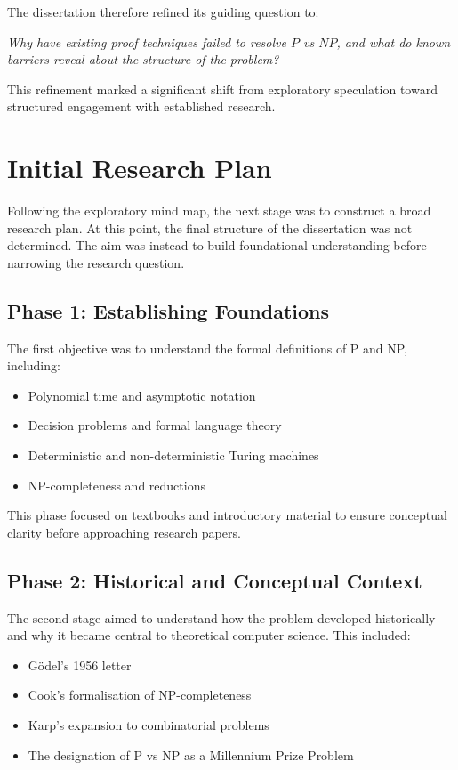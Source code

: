 \documentclass[12pt]{article}
\begin{document}
The dissertation therefore refined its guiding question to:

\textit{Why have existing proof techniques failed to resolve $P$ vs $NP$, and what do known barriers reveal about the structure of the problem?}

This refinement marked a significant shift from exploratory speculation toward structured engagement with established research.

\section{Initial Research Plan}

Following the exploratory mind map, the next stage was to construct a broad research plan.
At this point, the final structure of the dissertation was not determined.
The aim was instead to build foundational understanding before narrowing the research question.

\subsection*{Phase 1: Establishing Foundations}

The first objective was to understand the formal definitions of P and NP, including:
\begin{itemize}
    \item Polynomial time and asymptotic notation
    \item Decision problems and formal language theory
    \item Deterministic and non-deterministic Turing machines
    \item NP-completeness and reductions
\end{itemize}

This phase focused on textbooks and introductory material to ensure conceptual clarity before approaching research papers.

\subsection*{Phase 2: Historical and Conceptual Context}

The second stage aimed to understand how the problem developed historically and why it became central to theoretical computer science. This included:
\begin{itemize}
    \item Gödel's 1956 letter
    \item Cook's formalisation of NP-completeness
    \item Karp's expansion to combinatorial problems
    \item The designation of P vs NP as a Millennium Prize Problem
\end{itemize}
\end{document}
